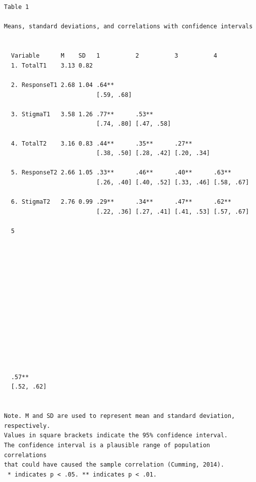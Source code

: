 \documentclass[
  english,
]{book}
\begin{document}
\begin{verbatim}


Table 1 

Means, standard deviations, and correlations with confidence intervals
 

  Variable      M    SD   1          2          3          4         
  1. TotalT1    3.13 0.82                                            
                                                                     
  2. ResponseT1 2.68 1.04 .64**                                      
                          [.59, .68]                                 
                                                                     
  3. StigmaT1   3.58 1.26 .77**      .53**                           
                          [.74, .80] [.47, .58]                      
                                                                     
  4. TotalT2    3.16 0.83 .44**      .35**      .27**                
                          [.38, .50] [.28, .42] [.20, .34]           
                                                                     
  5. ResponseT2 2.66 1.05 .33**      .46**      .40**      .63**     
                          [.26, .40] [.40, .52] [.33, .46] [.58, .67]
                                                                     
  6. StigmaT2   2.76 0.99 .29**      .34**      .47**      .62**     
                          [.22, .36] [.27, .41] [.41, .53] [.57, .67]
                                                                     
  5         
            
            
            
            
            
            
            
            
            
            
            
            
            
            
  .57**     
  [.52, .62]
            

Note. M and SD are used to represent mean and standard deviation, respectively.
Values in square brackets indicate the 95% confidence interval.
The confidence interval is a plausible range of population correlations 
that could have caused the sample correlation (Cumming, 2014).
 * indicates p < .05. ** indicates p < .01.
 
\end{verbatim}
\end{document}
